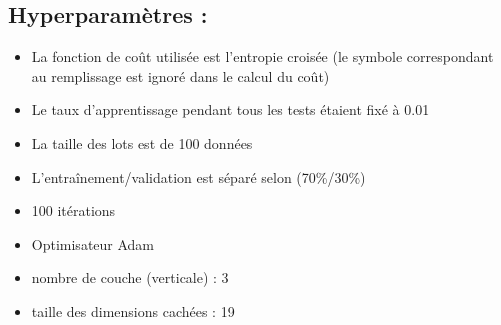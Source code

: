 \subsection{Hyperparamètres :}
\begin{itemize}
\item La fonction de coût utilisée est l'entropie croisée (le symbole correspondant au remplissage est ignoré dans le calcul du coût)
\item Le taux d'apprentissage pendant tous les tests étaient fixé à 0.01
\item La taille des lots est de 100 données
\item L'entraînement/validation est séparé selon (70\%/30\%)
\item 100 itérations
\item Optimisateur Adam
\item nombre de couche (verticale) : 3
\item taille des dimensions cachées : 19
\end{itemize}





